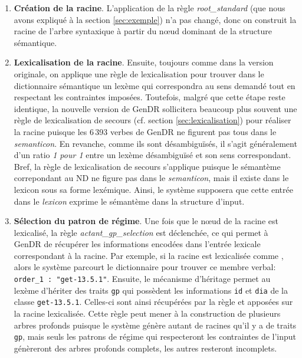\begin{enumerate}
  \item \textbf{Création de la racine}.
  L'application de la règle \emph{root\_standard} (que nous avons expliqué à la section \ref{sec:exemple}) n'a pas changé, donc on construit la racine de l'arbre syntaxique à partir du n\oe{}ud dominant de la structure sémantique.

  \item \textbf{Lexicalisation de la racine}.
  Ensuite, toujours comme dans la version originale, on applique une règle de lexicalisation pour trouver dans le dictionnaire sémantique un lexème qui correspondra au sens demandé tout en respectant les contraintes imposées. Toutefois, malgré que cette étape reste identique, la nouvelle version de GenDR sollicitera beaucoup plus souvent une règle de lexicalisation de secours (cf. section \ref{sec:lexicalisation}) pour réaliser la racine puisque les 6\,393 verbes de GenDR ne figurent pas tous dans le \emph{semanticon}. En revanche, comme ils sont désambiguïsés, il s'agit généralement d'un ratio \emph{1 pour 1} entre un lexème désambiguïsé et son sens correspondant. Bref, la règle de lexicalisation de secours s'applique puisque le sémantème correpondant au \ac{ND} ne figure pas dans le \emph{semanticon}, mais il existe dans le lexicon sous sa forme lexémique. Ainsi, le système supposera que cette entrée dans le \emph{lexicon} exprime le sémantème dans la structure d'input.

  \item \textbf{Sélection du patron de régime}.
  Une fois que le n\oe{}ud de la racine est lexicalisé, la règle \emph{actant\_gp\_selection} est déclenchée, ce qui permet à GenDR de récupérer les informations encodées dans l'entrée lexicale correspondant à la racine. Par exemple, si la racine est lexicalisée comme , alors le système parcourt le dictionnaire pour trouver ce membre verbal: \lstinline|order_1 : "get-13.5.1"|. Ensuite, le mécanisme d'héritage permet au lexème  d'hériter des traits \texttt{gp} qui possèdent les informations \texttt{id} et \texttt{dia} de la classe \texttt{get-13.5.1}. Celles-ci sont ainsi récupérées par la règle et apposées sur la racine lexicalisée. Cette règle peut mener à la construction de plusieurs arbres profonds puisque le système génère autant de racines qu'il y a de traits \texttt{gp}, mais seuls les patrons de régime qui respecteront les contraintes de l'input génèreront des arbres profonds complets, les autres resteront incomplets.
	

\end{enumerate}
